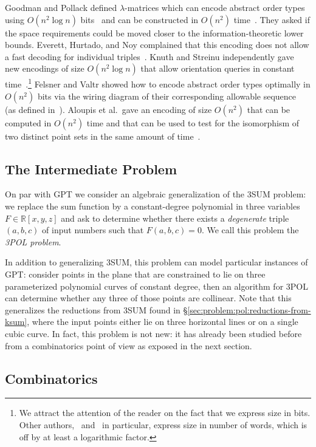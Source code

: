 Goodman and Pollack defined \(\lambda\)-matrices which can encode abstract order
types using \( O(n^2 \log{n}) \) bits~\cite{GP83} and can be constructed in
\(O(n^2)\) time~\cite{EOS86}. They asked if the space
requirements could be moved closer to the information-theoretic lower bounds.
Everett, Hurtado, and Noy complained that this encoding does not
allow a fast decoding for individual triples~\cite{EHN99}.
Knuth and Streinu independently gave new encodings of size \(O(n^2 \log n)\)
that allow orientation queries in constant time~\cite{Knu92,St97}.\footnote{%
We attract the attention of the reader on the fact that we express size in
bits.
Other authors,~\cite{EHN99} and~\cite{St97} in particular,
express size in number of words, which is off by at least a logarithmic factor.}
Felsner and Valtr showed how to encode abstract order types optimally in
\(O(n^2)\) bits via the wiring diagram of their corresponding allowable
sequence~\cite{Fe96, FV11} (as defined in~\cite{Go80}). Aloupis et al.\ gave
an encoding of size \(O(n^2)\) that can be computed in \(O(n^2)\) time and that
can be used to test for the isomorphism of two distinct point sets in the same
amount of time~\cite{AILOW14}.

\subsection{The Intermediate Problem}
\label{sec:problem:pol:3pol}

On par with GPT we consider an algebraic generalization of the 3SUM problem:
we replace the sum function by a constant-degree polynomial in three variables
$F \in \mathbb{R}[x,y,z]$ and ask to determine whether there exists a
\emph{degenerate} triple $(a,b,c)$ of input numbers such that $F(a,b,c)=0$. We
call this problem the \emph{3POL problem}.
%


In addition to generalizing 3SUM, this problem can model particular
instances of GPT: consider points in the plane that are constrained to
lie on three parameterized polynomial curves of constant degree, then an
algorithm for 3POL can determine whether any three of those points are
collinear. Note that this generalizes the reductions from 3SUM found in
\S\ref{sec:problem:pol:reductions-from-ksum}, where the input points either lie
on three horizontal lines or on a single cubic curve.
%
In fact, this problem is not new: it has already been studied before from a
combinatorics point of view as exposed in the next section.

\subsection{Combinatorics}%
\label{sec:problem:pol:combinatorics}

